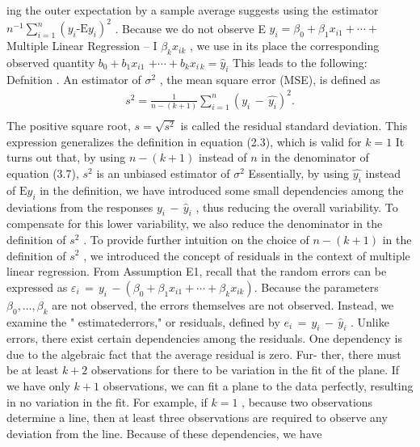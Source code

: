 \documentclass[11pt]{article}
\begin{document}
ing the outer expectation by a sample average suggests using the estimator
\(n^{-1} \sum_{i \mathop=1}^{n} ( y_{i} \textrm{-E} y_{i} )^{2}\) . Because we do not observe E \(y_{i}=\beta_{0}+\beta_{1} x_{i 1}+\cdots+\)
 Multiple Linear Regression -- I
\(\beta_{k} x_{i k}\) , we use in its place the corresponding observed quantity \(b_{0}+b_{1} x_{i 1}\)
\({+\cdots+b_{k} x_{i \, k}=\widehat{y}_{i}}\) This leads to the following:
Defnition . An estimator of \(\sigma^{2}\) , the mean square error (MSE), is defined as
\[
\begin{aligned} {s^{2}=\frac{1} {n-( k+1 )} \sum_{i=1}^{n} \left( y_{i} \,-\, \widehat{y_{i}} \right)^{2} .} \\ \end{aligned} \tag{3.7}
\]
The positive square root, \(s=\sqrt{s^{2}}\) is called the residual standard deviation.
This expression generalizes the definition in equation (2.3), which is valid for
\(k=1\) It turns out that, by using \(n-( k+1 )\) instead of \(n\) in the denominator of
equation (3.7), \(s^{2}\) is an unbiased estimator of \(\sigma^{2}\) Essentially, by using \(\widehat{y_{i}}\) instead
of \(\textrm{E} y_{i}\) in the definition, we have introduced some small dependencies among
the deviations from the responses \(y_{i} \,-\, \widehat{y}_{i}\) , thus reducing the overall variability.
To compensate for this lower variability, we also reduce the denominator in the
 definition of \(s^{2}\) .
To provide further intuition on the choice of \(n-( k+1 )\) in the definition
of \(s^{2}\) , we introduced the concept of residuals in the context of multiple linear
regression. From Assumption E1, recall that the random errors can be expressed
as \(\varepsilon_{i} \,=\, y_{i} \,-( \beta_{0}+\beta_{1} x_{i 1}+\cdots+\beta_{k} x_{i k} ) .\) Because the parameters \(\beta_{0} , \ldots, \beta_{k}\) are
not observed, the errors themselves are not observed. Instead, we examine the
" estimatederrors," or residuals, defined by \(e_{i} \,=\, y_{i} \,-\, \widehat{y}_{i}\) .
Unlike errors, there exist certain dependencies among the residuals. One
dependency is due to the algebraic fact that the average residual is zero. Fur-
ther, there must be at least \(k+2\) observations for there to be variation in the
fit of the plane. If we have only \(k+1\) observations, we can fit a plane to the
 data perfectly, resulting in no variation in the fit. For example, if \(k=1\) , because
two observations determine a line, then at least three observations are required
to observe any deviation from the line. Because of these dependencies, we have
\end{document}
